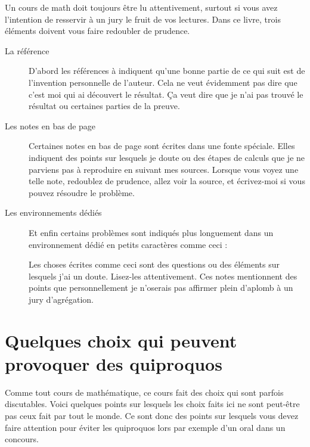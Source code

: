 Un cours de math doit toujours être lu attentivement, surtout si vous avez l'intention de resservir à un jury le fruit de vos lectures. Dans ce livre, trois éléments doivent vous faire redoubler de prudence.

\begin{description}
	\item[La référence \cite{MonCerveau}]
	      D'abord les références à \cite{MonCerveau} indiquent qu'une bonne partie de ce qui suit est de l'invention personnelle de l'auteur. Cela ne veut évidemment pas dire que c'est moi qui ai découvert le résultat. Ça veut dire que je n'ai pas trouvé le résultat ou certaines parties de la preuve.
	\item[Les notes en bas de page]
	      Certaines notes en bas de page sont écrites dans une fonte spéciale. Elles indiquent des points sur lesquels je doute ou des étapes de calculs que je ne parviens pas à reproduire en suivant mes sources. Lorsque vous voyez une telle note, redoublez de prudence, allez voir la source, et écrivez-moi si vous pouvez résoudre le problème.
	\item[Les environnements dédiés]
	      Et enfin certains problèmes sont indiqués plus longuement dans un environnement dédié en petits caractères comme ceci :

	      \begin{probleme}
		      Les choses écrites comme ceci sont des questions ou des éléments sur lesquels j'ai un doute. Lisez-les attentivement. Ces notes mentionnent des points que personnellement je n'oserais pas affirmer plein d'aplomb à un jury d'agrégation.
	      \end{probleme}
\end{description}

\section{Quelques choix qui peuvent provoquer des quiproquos}
\label{SECooINTROquiproquos}

Comme tout cours de mathématique, ce cours fait des choix qui sont parfois discutables. Voici quelques points sur lesquels les choix faits ici ne sont peut-être pas ceux fait par tout le monde. Ce sont donc des points sur lesquels vous devez faire attention pour éviter les quiproquos lors par exemple d'un oral dans un concours.

